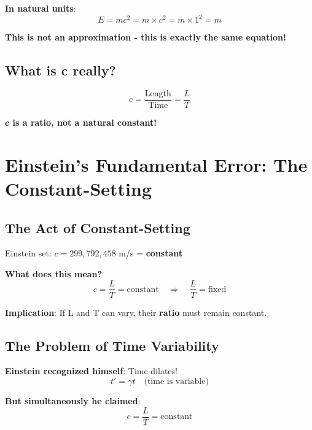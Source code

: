 \documentclass[12pt,a4paper]{article}
\begin{document}
	\textbf{In natural units}:
	\begin{equation}
		E = mc^2 = m \times c^2 = m \times 1^2 = m
	\end{equation}
	
	\textbf{This is not an approximation - this is exactly the same equation!}
	
	\subsection{What is c really?}
	
	\begin{equation}
		c = \frac{\text{Length}}{\text{Time}} = \frac{L}{T}
	\end{equation}
	
	\textbf{c is a ratio, not a natural constant!}
	
	\section{Einstein's Fundamental Error: The Constant-Setting}
	
	\subsection{The Act of Constant-Setting}
	
	Einstein set: $c = 299,792,458$ m/s = \textbf{constant}
	
	\textbf{What does this mean?}
	\begin{equation}
		c = \frac{L}{T} = \text{constant} \quad \Rightarrow \quad \frac{L}{T} = \text{fixed}
	\end{equation}
	
	\textbf{Implication}: If L and T can vary, their \textbf{ratio} must remain constant.
	
	\subsection{The Problem of Time Variability}
	
	\textbf{Einstein recognized himself}: Time dilates!
	\begin{equation}
		t' = \gamma t \quad \text{(time is variable)}
	\end{equation}
	
	\textbf{But simultaneously he claimed}: 
	\begin{equation}
		c = \frac{L}{T} = \text{constant}
	\end{equation}
	
\end{document}
